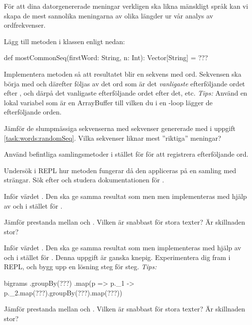 \Task \label{task:words:mostCommonSeq} För att dina datorgenererade meningar verkligen ska likna mänskligt språk kan vi skapa de mest sannolika meningarna av olika längder ur vår analys av ordfrekvenser.

Lägg till metoden  i klassen  enligt nedan:
\begin{Code}
def mostCommonSeq(firstWord: String, n: Int): Vector[String] = ???
\end{Code}
\Subtask Implementera metoden så att resultatet blir en sekvens med  ord. Sekvensen ska börja med  och därefter följas av det ord som är det \emph{vanligaste} efterföljande ordet efter , och därpå det vanligaste efterföljande ordet efter det, etc. \emph{Tips:} Använd en lokal variabel  som är en ArrayBuffer till vilken du i en -loop lägger de efterföljande orden.

\Subtask Jämför de slumpmässiga sekvenserna med sekvenser genererade med  i uppgift \ref{task:words:randomSeq}. Vilka sekvenser liknar mest ''riktiga'' meningar?


\Task Använd befintliga samlingsmetoder i stället för  för att registrera efterföljande ord.

\Subtask Undersök i REPL hur metoden  fungerar då den appliceras på en samling med strängar. Sök efter och studera dokumentationen för .

\Subtask Inför värdet . Den ska ge samma resultat som  men men implementeras med hjälp av  och  i stället för .

\Subtask\Uberkurs Jämför prestanda mellan  och . Vilken är snabbast för stora texter? Är skillnaden stor?

\Subtask Inför värdet . Den ska ge samma resultat som  men implementeras med hjälp av  och  i stället för .
Denna uppgift är ganska knepig. Experimentera dig fram i REPL, och bygg upp en lösning steg för steg. \emph{Tips:}
\begin{Code}
bigrams
  .groupBy(???)
  .map(p => p._1 -> p._2.map(???).groupBy(???).map(???))
\end{Code}

\Subtask\Uberkurs Jämför prestanda mellan  och . Vilken är snabbast för stora texter? Är skillnaden stor?


